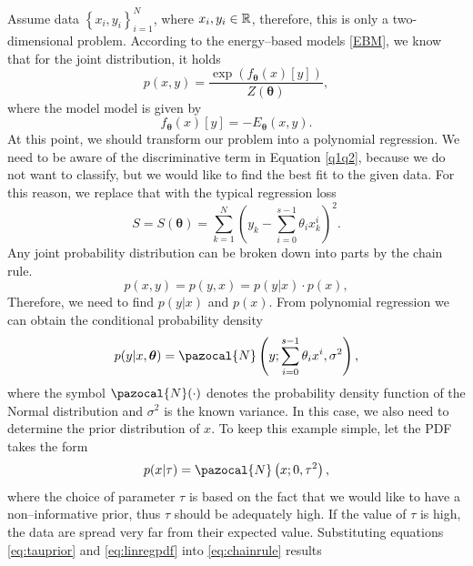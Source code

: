 Assume data $\left\lbrace x_i,y_i \right\rbrace_{i=1}^N$, where $x_i,y_i\in \mathbb{R}$, therefore, this is only a two-dimensional problem.  According to the energy--based models \ref{EBM}, we know that for the joint distribution, it holds
\begin{equation}
	p(x,y) = \frac{\exp{\left(f_{\boldsymbol{\theta}}(x)[y]\right)}}{Z(\boldsymbol{\theta})},
\end{equation}
where the model model is given by 
\begin{equation}
	f_{\boldsymbol{\theta}}(x)[y] = -E_{\boldsymbol{\theta}}(x,y) .
\end{equation}
At this point, we should transform our problem into a polynomial regression. We need to be aware of the discriminative term in Equation \eqref{q1q2}, because we do not want to classify, but we would like to find the best fit to the given data. For this reason, we replace that with the typical regression loss
\begin{equation}\label{S(theta)}
	S = S(\boldsymbol{\theta}) = \sum_{k=1}^N \left(y_k - \sum_{i=0}^{s-1} \theta_i x^i_k\right)^2.
\end{equation}	
Any joint probability distribution can be broken down into parts by the chain rule. 
\begin{equation}\label{eq:chainrule}
	p(x,y) =	p(y,x) = p(y\vert x)\cdot p(x),
\end{equation}
Therefore, we need to find $p(y\vert x)$ and $p(x)$. From polynomial regression we can obtain the conditional probability density 
\begin{equation}\label{eq:linregpdf}
	p(y\vert x, \boldsymbol{\theta}) = \pazocal{N}\left(y; \sum_{i=0}^{s-1} \theta_i x^i, \sigma^2 \right),
\end{equation}
where the symbol $\pazocal{N}(\cdot)$ denotes the probability density function of the Normal distribution and $\sigma^2$ is the known variance. In this case, we also need to determine the prior distribution of $x$. To keep this example simple, let the PDF takes the form
\begin{equation}\label{eq:tauprior}
	p(x|\tau) = \pazocal{N}\left(x; 0, \tau^2\right),
\end{equation}
where the choice of parameter $\tau$ is based on the fact that we would like to have a non--informative prior, thus $\tau$ should be adequately high. If the value of $\tau$ is high, the data are spread very far from their expected value.  Substituting equations \eqref{eq:tauprior} and \eqref{eq:linregpdf} into \eqref{eq:chainrule} results
